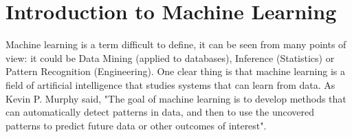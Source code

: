 
\section{Introduction to Machine Learning}
Machine learning is a term difficult to define, it can be seen from many points of view: it could be Data Mining (applied to databases), Inference (Statistics) or Pattern Recognition (Engineering). One clear thing is that machine learning is a field of artificial intelligence that studies systems that can learn from data. As Kevin P. Murphy said, "The goal of machine learning is to develop methods that can automatically detect patterns in data, and then to use the uncovered patterns to predict future data or other outcomes of interest". 

